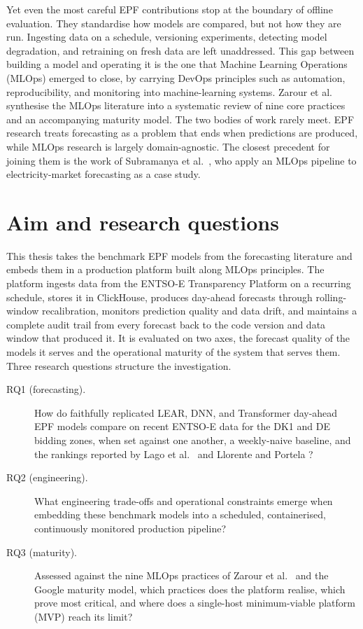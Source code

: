 Yet even the most careful EPF contributions stop at the boundary of offline
evaluation. They standardise how models are compared, but not how they
are run. Ingesting data on a schedule, versioning experiments, detecting
model degradation, and retraining on fresh data are left unaddressed. This gap
between building a model and operating it is the one that Machine Learning
Operations (MLOps) emerged to close, by carrying DevOps principles such as
automation, reproducibility, and monitoring into machine-learning systems.
Zarour et al.\ \cite{zarour2025} synthesise the MLOps literature into a
systematic review of nine core practices and an accompanying maturity model. The
two bodies of work rarely meet. EPF research treats forecasting as a problem
that ends when predictions are produced, while MLOps research is largely
domain-agnostic. The closest precedent for joining them is the work of
Subramanya et al.\ \cite{subramanya2022devops2mlops}, who apply an MLOps pipeline
to electricity-market forecasting as a case study.

\section{Aim and research questions}

This thesis takes the benchmark EPF models from the forecasting literature and
embeds them in a production platform built along MLOps principles.
The platform ingests data from the ENTSO-E Transparency Platform on a recurring
schedule, stores it in ClickHouse, produces day-ahead forecasts through
rolling-window recalibration, monitors prediction quality and data drift, and
maintains a complete audit trail from every forecast back to the code version
and data window that produced it. It is evaluated on two axes, the forecast
quality of the models it serves and the operational maturity of the
system that serves them. Three research questions structure the investigation.

\begin{description}
  \item[RQ1 (forecasting).] How do faithfully replicated LEAR, DNN, and
    Transformer day-ahead EPF models compare on recent ENTSO-E data for the DK1
    and DE bidding zones, when set against one another, a weekly-naive baseline,
    and the rankings reported by Lago et al.\ \cite{lago2021} and Llorente and
    Portela \cite{llorente2025transformer}?
  \item[RQ2 (engineering).] What engineering trade-offs and operational
    constraints emerge when embedding these benchmark models into a scheduled,
    containerised, continuously monitored production pipeline?
  \item[RQ3 (maturity).] Assessed against the nine MLOps practices of Zarour et
    al.\ \cite{zarour2025} and the Google maturity model, which practices does
    the platform realise, which prove most critical, and where does a
    single-host minimum-viable platform (MVP) reach its limit?
\end{description}

